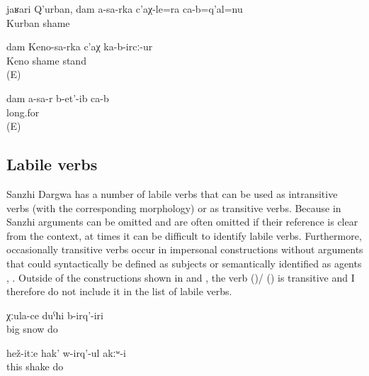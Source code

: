 	\begin{exe}	
		\ex	\label{ex:Hey, Kurban, I am ashamed in front of you}
	\gll	jaʁari	Q'urban,	dam	a-sa-rka	c'aχ-le=ra	ca-b=q'al=nu\\
			Kurban			shame	\\
	\glt	{}

	\ex	\label{ex:I got embarrassed in front of Ali}
	\gll	dam	Keno-sa-rka	c'aχ	ka-b-ircː-ur\\
			Keno	shame	stand\\
	\glt	{} (E)
	
	\ex	\label{ex:I miss you}
	\gll	dam	a-sa-r	b-et'-ib ca-b\\
				long.for \\
	\glt	{} (E)
\end{exe}




\subsection{Labile verbs}
\label{sec:Labile verbs}

Sanzhi Dargwa has a number of labile verbs that can be used as intransitive verbs (with the corresponding morphology) or as transitive verbs. Because in Sanzhi arguments can be omitted and are often omitted if their reference is clear from the context, at times it can be difficult to identify labile verbs. Furthermore, occasionally transitive verbs occur in impersonal constructions without arguments that could syntactically be defined as subjects or semantically identified as agents , . Outside of the constructions shown in  and , the verb  ()\slash{} () is transitive and I therefore do not include it in the list of labile verbs.
%
\begin{exe}
	\ex	\label{ex:It used to snow a lotA}
	\gll	χːula-ce	duˁħi	b-irq'-iri\\
		big	snow	do\\
	\glt	{}

	\ex	\label{ex:He was not shaking like this (i.e. not able to move)}
	\gll	hež-itːe	hak'	w-irq'-ul	akːʷ-i\\
		this	shake	do	\\
	\glt	{}
\end{exe}

